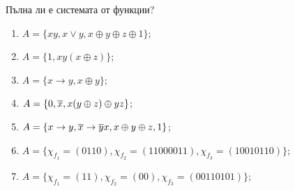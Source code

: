 \begin{problem} %
  Пълна ли е системата от функции?
  \begin{enumerate}[1)]
  \item
    $A = \{xy, x\vee y, x\oplus y\oplus z\oplus 1\}$;
  \item
    $A = \{1, xy(x\oplus z)\}$;
  \item
    $A = \{x\rightarrow y, x\oplus y\}$;
  \item
    $A = \{0, \overline{x}, x(y\oplus z)\oplus yz\}$;
  \item
    $A = \{x\rightarrow y, \overline{x}\rightarrow \overline{y}x, x\oplus y\oplus z, 1\}$;
  \item
    $A = \{\chi_{f_1} = (0110), \chi_{f_2} = (1100 0011), \chi_{f_3} = (1001 0110)\}$;
  \item
    $A = \{\chi_{f_1} = (11), \chi_{f_2} = (00), \chi_{f_3} = (0011 0101)\}$;
  \end{enumerate}
\end{problem}
